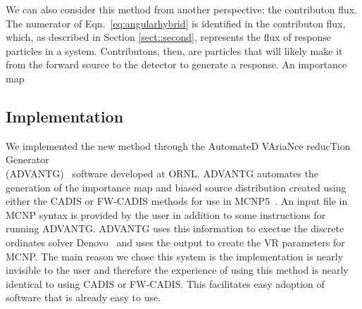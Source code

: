 \documentclass[12pt]{article}
\begin{document}
We can also consider this method from another perspective: the contributon flux. 
The numerator of Eqn.~\eqref{eq:angularhybrid} is identified in the contributon flux, which, as described in Section \ref{sect::second}, represents the flux of response particles in a system. 
Contributons, then, are particles that will likely make it from the forward source to the detector to generate a response. 
An importance map 
%
% 

%

\subsection{Implementation}
\label{subsect::implementation}

We implemented the new method through the AutomateD VAriaNce reducTion Generator\\ (ADVANTG)~\cite{wagner_automated_2002, mosher_new_2010} software developed at ORNL. 
ADVANTG automates the generation of the importance map and biased source distribution created using either the CADIS or FW-CADIS methods for use in MCNP5~\cite{brown_mcnp_2002}. 
An input file in MCNP syntax is provided by the user in addition to some instructions for running ADVANTG. 
ADVANTG uses this information to exectue the discrete ordinates solver Denovo~\cite{evans_denovo:_2010} and uses the output to create the VR parameters for MCNP.
The main reason we chose this system is the implementation is nearly invisible to the user and therefore the experience of using this method is nearly identical to using CADIS or FW-CADIS.
This facilitates easy adoption of software that is already easy to use.
\end{document}
